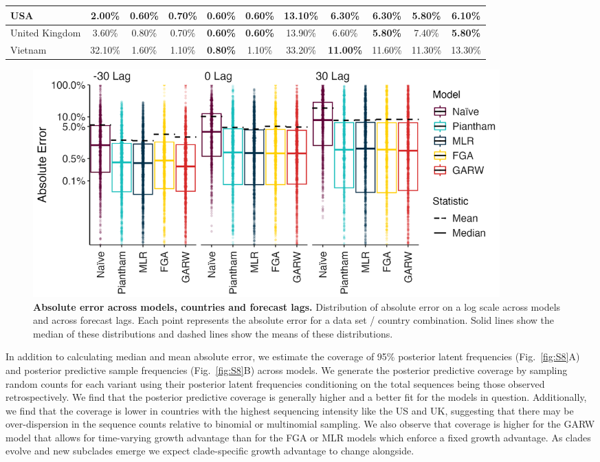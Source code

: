 \begin{table}[!ht]
\begin{adjustbox}{max width=\textwidth}
\begin{tabular}{|l|c|c|c|c|c|c|c|c|c|c|}
        USA & 2.00\% &\textbf{0.60\%} & 0.70\% & \textbf{0.60\%} & \textbf{0.60\%} & 13.10\% & 6.30\% & 6.30\% & \textbf{5.80\%} & 6.10\% \\ \hline
        United Kingdom & 3.60\% & 0.80\% & 0.70\% & \textbf{0.60\%} & \textbf{0.60\%} & 13.90\% & 6.60\% & \textbf{5.80\%} & 7.40\% & \textbf{5.80\%} \\ \hline
        Vietnam & 32.10\% & 1.60\% & 1.10\% & \textbf{0.80\%} & 1.10\% & 33.20\% & \textbf{11.00\%} & 11.60\% & 11.30\% & 13.30\% \\ \hline
    \end{tabular}
	\end{adjustbox}
\end{table}


\begin{figure}[tb!]
	\centering
	\includegraphics[width=0.87\textwidth]{figures/model_comp_B.png}
	\caption{\textbf{Absolute error across models, countries and forecast lags.}
	Distribution of absolute error on a log scale across models and across forecast lags.
	Each point represents the absolute error for a data set / country combination.
	Solid lines show the median of these distributions and dashed lines show the means of these distributions.
	}
	\label{fig:Fig3}
\end{figure}

In addition to calculating median and mean absolute error, we estimate the coverage of 95\% posterior latent frequencies (Fig.~\ref{fig:S8}A) and posterior predictive sample frequencies (Fig.~\ref{fig:S8}B) across models.
We generate the posterior predictive coverage by sampling random counts for each variant using their posterior latent frequencies conditioning on the total sequences being those observed retrospectively.
We find that the posterior predictive coverage is generally higher and a better fit for the models in question.
Additionally, we find that the coverage is lower in countries with the highest sequencing intensity like the US and UK, suggesting that there may be over-dispersion in the sequence counts relative to binomial or multinomial sampling.
We also observe that coverage is higher for the GARW model that allows for time-varying growth advantage than for the FGA or MLR models which enforce a fixed growth advantage.
As clades evolve and new subclades emerge we expect clade-specific growth advantage to change alongside.


